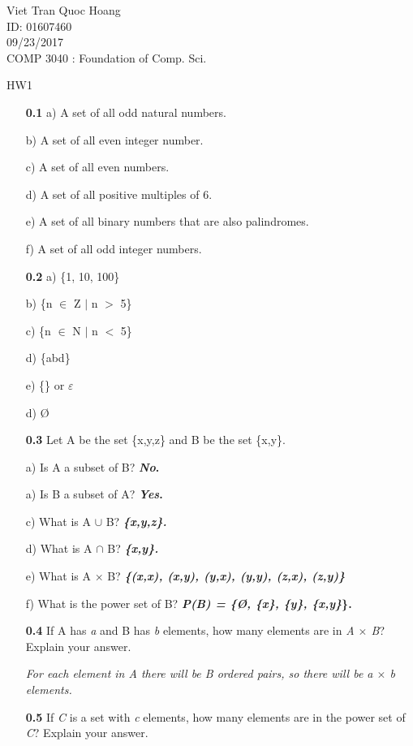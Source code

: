 \documentclass[12pt]{letter}
\begin{document}
Viet Tran Quoc Hoang \\ ID: 01607460 \\  09/23/2017 \\ COMP 3040 : Foundation of Comp. Sci.

\centering HW1

\flushleft

\begin{enumerate}
\item[\textbf{0.1}]
	a) A set of all odd natural numbers.

	b) A set of all even integer number.

	c) A set of all even numbers.

	d) A set of all positive multiples of 6.

	e) A set of all binary numbers that are also  palindromes.

	f) A set of all odd integer numbers.

\item[\textbf{0.2}]
	a) \{1, 10, 100\}

	b) \{n $\in$ Z $|$ n $>$ 5\}

	c) \{n $\in$ N $|$ n $<$ 5\}

	d) \{abd\}
	
	e) \{\} or $\varepsilon$

	d) \O

\item[\textbf{0.3}]Let A be the set \{x,y,z\} and B be the set \{x,y\}.

	a) Is A a subset of B? \textbf{\textit{No}.}

	a) Is B a subset of A?  \textbf{\textit{Yes}.}

	c) What is A $\cup$ B? \textbf{\textit{\{x,y,z\}.}}

	d) What is A $\cap$ B?  \textbf{\textit{\{x,y\}.}}

	e) What is A $\times$ B?  \textbf{\textit{\{(x,x), (x,y), (y,x), (y,y), (z,x), (z,y)\}}}
	
	f) What is the power set of B? \textbf{\textit{P(B) = \{\O, \{x\}, \{y\}, \{x,y\}}\}.}

\item[\textbf{0.4}] If A has \textit{a} and B has \textit{b} elements, how many elements are in \textit{A $\times$ B}? Explain your answer.

\setlength{\parindent}{0ex} \textit{For each element in A there will be B ordered pairs, so there will be a $\times$ b elements.}

\item[\textbf{0.5}] If \textit{C} is a set with \textit{c} elements, how many elements are in the power set of \textit{C}? Explain your answer.


\end{enumerate}
\end{document}
